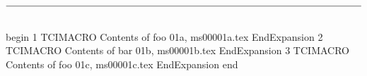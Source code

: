 

%
%

$\rule[18pt]{474pt}{0.5pt}\vspace{-15pt}$

begin
1
TCIMACRO
Contents of foo 01a, ms00001a.tex
EndExpansion
2
TCIMACRO
Contents of bar 01b, ms00001b.tex
EndExpansion
3
TCIMACRO
Contents of foo 01c, ms00001c.tex
EndExpansion
end
